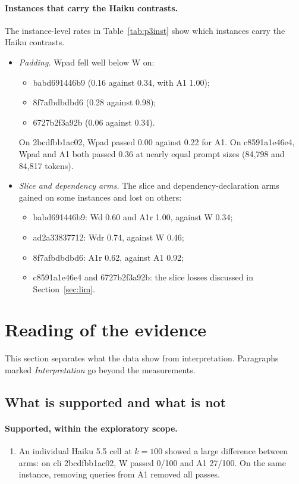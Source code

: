 \documentclass[10pt]{article}
\begin{document}
\paragraph{Instances that carry the Haiku contrasts.} The instance-level rates in Table~\ref{tab:p3inst} show which instances carry the Haiku contrasts.
\begin{itemize}
\item \emph{Padding.} Wpad fell well below W on:
  \begin{itemize}
  \item babd691446b9 (0.16 against 0.34, with A1 1.00);
  \item 8f7afbdbdbd6 (0.28 against 0.98);
  \item 6727b2f3a92b (0.06 against 0.34).
  \end{itemize}
  On 2bcdfbb1ac02, Wpad passed 0.00 against 0.22 for A1. On c8591a1e46e4, Wpad and A1 both passed 0.36 at nearly equal prompt sizes (84,798 and 84,817 tokens).
\item \emph{Slice and dependency arms.} The slice and dependency-declaration arms gained on some instances and lost on others:
  \begin{itemize}
  \item babd691446b9: Wd 0.60 and A1r 1.00, against W 0.34;
  \item ad2a33837712: Wdr 0.74, against W 0.46;
  \item 8f7afbdbdbd6: A1r 0.62, against A1 0.92;
  \item c8591a1e46e4 and 6727b2f3a92b: the slice losses discussed in Section~\ref{sec:lim}.
  \end{itemize}
\end{itemize}

\section{Reading of the evidence}

This section separates what the data show from interpretation. Paragraphs marked \emph{Interpretation} go beyond the measurements.

\subsection{What is supported and what is not}

\paragraph{Supported, within the exploratory scope.}
\begin{enumerate}
\item An individual Haiku 5.5 cell at $k=100$ showed a large difference between arms: on cli 2bcdfbb1ac02, W passed 0/100 and A1 27/100. On the same instance, removing queries from A1 removed all passes.
\end{enumerate}
\end{document}
